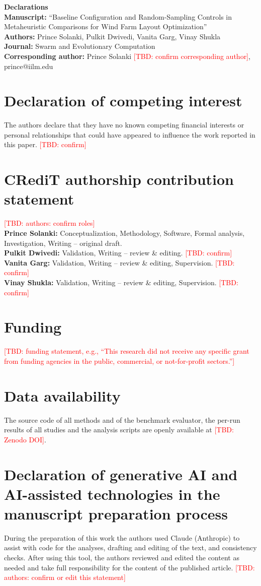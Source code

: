 \documentclass[11pt,a4paper]{article}
\newcommand{\TBD}[1]{\textcolor{red}{[TBD: #1]}}
\begin{document}
{\large\textbf{Declarations}}\\[0.3em]
\textbf{Manuscript:} ``Baseline Configuration and Random-Sampling Controls in Metaheuristic Comparisons for Wind Farm Layout Optimization''\\
\textbf{Authors:} Prince Solanki, Pulkit Dwivedi, Vanita Garg, Vinay Shukla\\
\textbf{Journal:} Swarm and Evolutionary Computation\\
\textbf{Corresponding author:} Prince Solanki \TBD{confirm corresponding author}, prince@iilm.edu

\section*{Declaration of competing interest}
The authors declare that they have no known competing financial interests or personal relationships that could have appeared to influence the work reported in this paper. \TBD{confirm}

\section*{CRediT authorship contribution statement}
\TBD{authors: confirm roles}\\
\textbf{Prince Solanki:} Conceptualization, Methodology, Software, Formal analysis, Investigation, Writing -- original draft.\\
\textbf{Pulkit Dwivedi:} Validation, Writing -- review \& editing. \TBD{confirm}\\
\textbf{Vanita Garg:} Validation, Writing -- review \& editing, Supervision. \TBD{confirm}\\
\textbf{Vinay Shukla:} Validation, Writing -- review \& editing, Supervision. \TBD{confirm}

\section*{Funding}
\TBD{funding statement, e.g., ``This research did not receive any specific grant from funding agencies in the public, commercial, or not-for-profit sectors.''}

\section*{Data availability}
The source code of all methods and of the benchmark evaluator, the per-run results of all studies and the analysis scripts are openly available at \TBD{Zenodo DOI}.

\section*{Declaration of generative AI and AI-assisted technologies in the manuscript preparation process}
During the preparation of this work the authors used Claude (Anthropic) to assist with code for the analyses, drafting and editing of the text, and consistency checks. After using this tool, the authors reviewed and edited the content as needed and take full responsibility for the content of the published article.
\TBD{authors: confirm or edit this statement}
\end{document}
